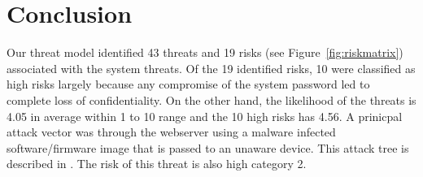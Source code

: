 \chapter{Conclusion}
\label{ch:conclusion}


Our threat model identified 43 threats and 19 risks (see Figure~\ref{fig:riskmatrix}) associated with the system threats. Of the 19 identified risks, 10 were classified as high risks largely because
any compromise of the system password led to complete loss of confidentiality.
On the other hand, the likelihood of the threats is 4.05 in average within 1 to 10 range and the 10 high
risks has 4.56. A prinicpal attack vector was through the webserver using a malware infected software/firmware image that is passed to an unaware device. This attack tree is described in . The risk of this threat is also high category 2. 

